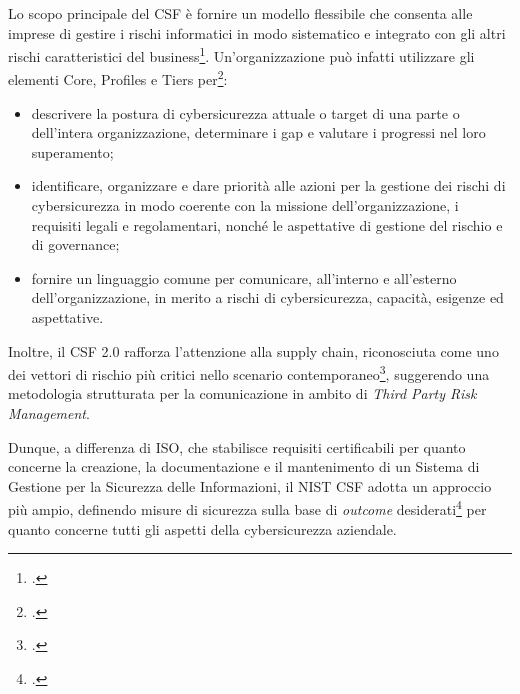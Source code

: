 Lo scopo principale del CSF è fornire un modello flessibile che consenta alle imprese di 
gestire i rischi informatici in modo sistematico e integrato con gli altri rischi caratteristici del business\footcite[p. 2]{nist-csf}.
Un'organizzazione può infatti utilizzare gli elementi Core, Profiles e Tiers per\footcite[pp. 1--2]{nist-csf}:
\begin{itemize}
    \item descrivere la postura di cybersicurezza attuale o target di una parte o dell’intera organizzazione, determinare i gap e 
    valutare i progressi nel loro superamento;
    \item identificare, organizzare e dare priorità alle azioni per la gestione dei rischi di cybersicurezza in modo coerente con la missione 
    dell’organizzazione, i requisiti legali e regolamentari, nonché le aspettative di gestione del rischio e di governance;
	\item fornire un linguaggio comune per comunicare, all’interno e all’esterno dell’organizzazione, in merito a rischi di 
    cybersicurezza, capacità, esigenze ed aspettative.
\end{itemize}
Inoltre, il CSF 2.0 rafforza l’attenzione alla supply chain, riconosciuta come uno dei vettori di rischio più critici 
nello scenario contemporaneo\footcite{nist-csf}, suggerendo una metodologia strutturata per la comunicazione in
ambito di \textit{Third Party Risk Management}.

Dunque, a differenza di ISO, che stabilisce requisiti certificabili per quanto concerne la creazione, la 
documentazione e il mantenimento di un Sistema di Gestione per la Sicurezza delle Informazioni, il 
NIST CSF adotta un approccio più ampio, definendo misure di sicurezza sulla base di \textit{outcome} 
desiderati\footcite[pp. 3--4]{nist-csf} per quanto concerne tutti gli aspetti della cybersicurezza aziendale.


